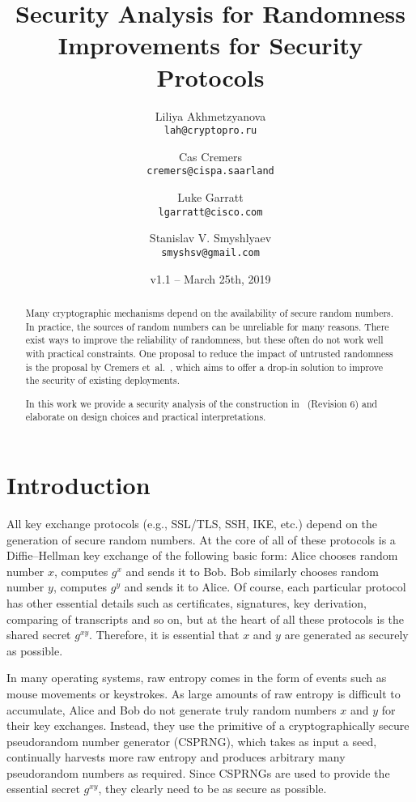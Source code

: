 \documentclass{article}
\author{
  Liliya Akhmetzyanova\\
  \texttt{lah@cryptopro.ru}
  \and
  Cas Cremers\\
  \texttt{cremers@cispa.saarland}
  \and
  Luke Garratt\\
  \texttt{lgarratt@cisco.com}
  \and
  Stanislav V. Smyshlyaev\\
  \texttt{smyshsv@gmail.com}
}
\title{Security Analysis for Randomness Improvements for Security
Protocols}
\date{v1.1 -- March 25th, 2019}
\begin{document}
  \maketitle


\begin{abstract}
Many cryptographic mechanisms depend on the availability of secure
	random numbers. In practice, the sources of random numbers can
	be unreliable for many reasons. There exist ways to improve the
	reliability of randomness, but these often do not work well with
	practical constraints.
	One proposal to reduce the impact of untrusted randomness is the
	proposal by Cremers et~al.~\cite{randomnessirtf}, which aims to
	offer a drop-in solution to improve the security of existing deployments. 

	In this work we provide a security analysis of the
	construction in~\cite{randomnessirtf} (Revision 6) and elaborate
	on design choices and practical interpretations.
\end{abstract}

\section{Introduction}
All key exchange protocols (e.g., SSL/TLS, SSH, IKE, etc.) depend on the generation of secure random numbers. At the core of all of these protocols is a Diffie--Hellman key exchange of the following basic form: Alice chooses random number $x$, computes $g^x$ and sends it to Bob. Bob similarly chooses random number $y$, computes $g^y$ and sends it to Alice. Of course, each particular protocol has other essential details such as certificates, signatures, key derivation, comparing of transcripts and so on, but at the heart of all these protocols is the shared secret $g^{xy}$. Therefore, it is essential that $x$ and $y$ are generated as securely as possible. 

In many operating systems, raw entropy comes in the form of events such as mouse movements or keystrokes. As large amounts of raw entropy is difficult to accumulate, Alice and Bob do not generate truly random numbers $x$ and $y$ for their key exchanges. Instead, they use the primitive of a cryptographically secure pseudorandom number generator (CSPRNG), which takes as input a seed, continually harvests more raw entropy and  produces arbitrary many pseudorandom numbers as required. Since CSPRNGs are used to provide the essential secret $g^{xy}$, they clearly need to be as secure as possible. 
\end{document}
